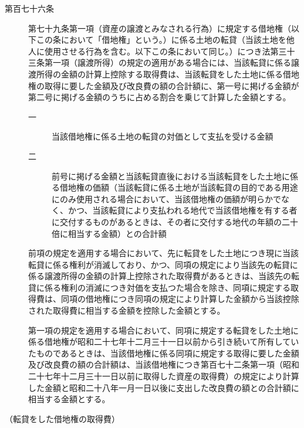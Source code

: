 \documentclass[twocolumn,a4j,10pt]{ltjtarticle}
\begin{document}
\begin{description}
\item[第百七十六条]第七十九条第一項（資産の譲渡とみなされる行為）に規定する借地権（以下この条において「借地権」という。）に係る土地の転貸（当該土地を他人に使用させる行為を含む。以下この条において同じ。）につき法第三十三条第一項（譲渡所得）の規定の適用がある場合には、当該転貸に係る譲渡所得の金額の計算上控除する取得費は、当該転貸をした土地に係る借地権の取得に要した金額及び改良費の額の合計額に、第一号に掲げる金額が第二号に掲げる金額のうちに占める割合を乗じて計算した金額とする。
\begin{description}
\item[一]当該借地権に係る土地の転貸の対価として支払を受ける金額
\item[二]前号に掲げる金額と当該転貸直後における当該転貸をした土地に係る借地権の価額（当該転貸に係る土地が当該転貸の目的である用途にのみ使用される場合において、当該借地権の価額が明らかでなく、かつ、当該転貸により支払われる地代で当該借地権を有する者に交付するものがあるときは、その者に交付する地代の年額の二十倍に相当する金額）との合計額
\end{description}
\item[]前項の規定を適用する場合において、先に転貸をした土地につき現に当該転貸に係る権利が消滅しており、かつ、同項の規定により当該先の転貸に係る譲渡所得の金額の計算上控除された取得費があるときは、当該先の転貸に係る権利の消滅につき対価を支払つた場合を除き、同項に規定する取得費は、同項の借地権につき同項の規定により計算した金額から当該控除された取得費に相当する金額を控除した金額とする。
\item[]第一項の規定を適用する場合において、同項に規定する転貸をした土地に係る借地権が昭和二十七年十二月三十一日以前から引き続いて所有していたものであるときは、当該借地権に係る同項に規定する取得に要した金額及び改良費の額の合計額は、当該借地権につき第百七十二条第一項（昭和二十七年十二月三十一日以前に取得した資産の取得費）の規定により計算した金額と昭和二十八年一月一日以後に支出した改良費の額との合計額に相当する金額とする。
\end{description}
\noindent\hspace{10pt}（転貸をした借地権の取得費）
\end{document}
